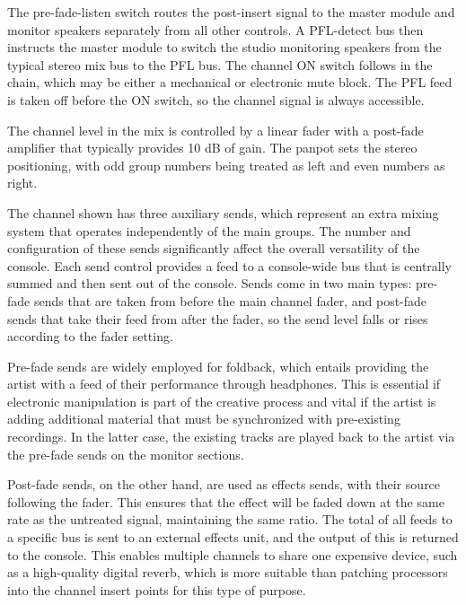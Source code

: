 The pre-fade-listen switch routes the post-insert signal to the master module
and monitor speakers separately from all other controls. A PFL-detect bus then
instructs the master module to switch the studio monitoring speakers from the
typical stereo mix bus to the PFL bus. The channel ON switch follows in the
chain, which may be either a mechanical or electronic mute block. The PFL feed
is taken off before the ON switch, so the channel signal is
always accessible.

The channel level in the mix is controlled by a linear fader
with a post-fade amplifier that typically provides 10 dB of gain. The panpot
sets the stereo positioning, with odd group numbers being treated as left and
even numbers as right.

The channel shown has three auxiliary sends, which
represent an extra mixing system that operates independently of the main
groups. The number and configuration of these sends significantly affect the
overall versatility of the console. Each send control provides a feed to a
console-wide bus that is centrally summed and then sent out of the console.
Sends come in two main types: pre-fade sends that are taken from before the
main channel fader, and post-fade sends that take their feed from after the
fader, so the send level falls or rises according to the fader setting.

Pre-fade sends are widely employed for foldback, which entails providing the
artist with a feed of their performance through headphones. This is essential
if electronic manipulation is part of the creative process and vital if the
artist is adding additional material that must be synchronized with
pre-existing recordings. In the latter case, the existing tracks are played
back to the artist via the pre-fade sends on the monitor sections.

Post-fade sends, on the other hand, are used as effects sends, with their
source following the fader. This ensures that the effect will be faded down at
the same rate as the untreated signal, maintaining the same ratio. The total of
all feeds to a specific bus is sent to an external effects unit, and the output
of this is returned to the console. This enables multiple channels to share one
expensive device, such as a high-quality digital reverb, which is more suitable
than patching processors into the channel insert points for this type of
purpose.

